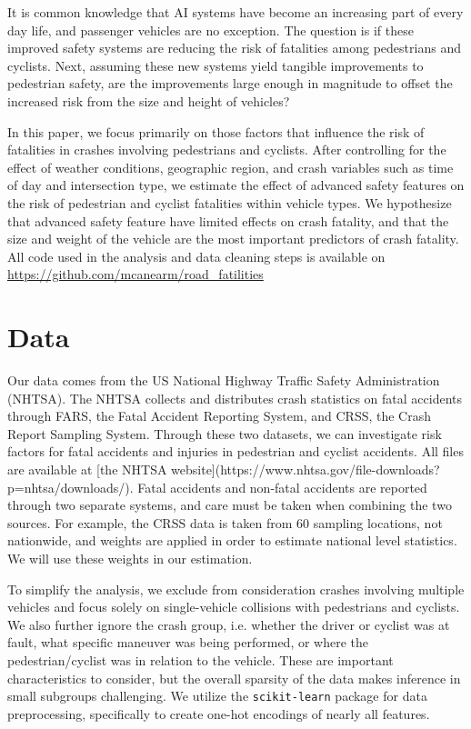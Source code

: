 \documentclass[12pt]{article}
\begin{document}
It is common knowledge that AI systems have become an increasing part of every day life, and passenger
vehicles are no exception. The question is if these improved safety systems are reducing the risk of fatalities
among pedestrians and cyclists. Next, assuming these new systems yield tangible improvements to pedestrian safety,
are the improvements large enough in magnitude to offset the increased risk from the size and height of vehicles?

In this paper, we focus primarily on those factors that influence the risk of fatalities in crashes involving pedestrians
and cyclists. After controlling for the effect of weather conditions,
geographic region, and crash variables such as time of day and intersection type, we estimate the effect
of advanced safety features on the risk of pedestrian and cyclist fatalities within vehicle types. We hypothesize
that advanced safety feature have limited effects on crash fatality, and that the size and weight of the vehicle are 
the most important predictors of crash fatality. All code used in the analysis and data cleaning steps is available on
\url{https://github.com/mcanearm/road_fatilities}


\section{Data}

Our data comes from the US National Highway Traffic Safety Administration (NHTSA). The NHTSA collects and distributes
crash statistics on fatal accidents through FARS, the Fatal Accident Reporting System, and CRSS, the Crash Report
Sampling System. Through these two datasets, we can investigate risk factors for fatal accidents and injuries in
pedestrian and cyclist accidents. All files are available at
    [the NHTSA website](https://www.nhtsa.gov/file-downloads?p=nhtsa/downloads/).  Fatal accidents and non-fatal 
accidents are reported through two separate systems, and care must be taken when combining the two sources. For example,
the CRSS data is taken from 60 sampling locations, not nationwide, and weights are applied in order to estimate 
national level statistics\cite{national_highway_traffic_safety_administration_crash_nodate}. We will use these weights
in our estimation. 

To simplify the analysis, we exclude from consideration crashes involving multiple vehicles and focus solely 
on single-vehicle collisions with pedestrians and cyclists. We also further ignore the crash group, i.e. 
whether the driver or cyclist was at fault, what specific maneuver was being performed, or where the pedestrian/cyclist
was in relation to the vehicle. These are important characteristics to consider, but the overall sparsity of the data 
makes inference in small subgroups challenging. We utilize the \texttt{scikit-learn} package for data preprocessing,
specifically to create one-hot encodings of nearly all features\cite{pedregosa_scikit-learn_2011}.
\end{document}

